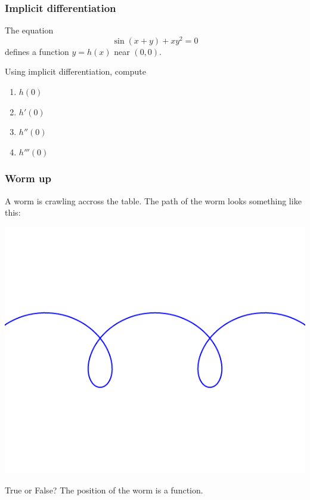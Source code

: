 \begin{frame}[t]
	\frametitle{Implicit differentiation}

	The equation
	\[
		\sin (x+y) + xy^{2}= 0
	\]
	defines a function $\displaystyle y=h(x)$ near $(0,0)$. \href{https://www.desmos.com/calculator/bvupq00r6s}{}

	Using implicit differentiation, compute
	\begin{multicols}{4}
		\begin{enumerate}
			\item $\displaystyle h(0)$

			\item $\displaystyle h'(0)$

			\item $\displaystyle h''(0)$

			\item $\displaystyle h'''(0)$
		\end{enumerate}
	\end{multicols}
\end{frame}

\begin{frame}[t]
	\frametitle{Worm up}


	A worm is crawling accross the table. The path of the worm looks something
	like this:


	\begin{center}
		\includegraphics[scale=.3]{G11}
	\end{center}

	\vspace{-1cm}

	\begin{block}{True or False?}
		The position of the worm is a function.
	\end{block}
\end{frame}

